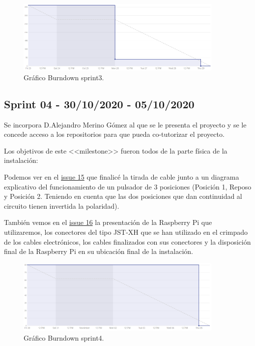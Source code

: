 \begin{figure}[h]
    \centering
    \includegraphics[width=0.9\textwidth]{img/BurnDown/3.PNG}
    \caption{Gráfico Burndown sprint3. } \label{BD3}
\end{figure}

\subsection{Sprint 04 - 30/10/2020 - 05/10/2020}
Se incorpora D.Alejandro Merino Gómez al que se le presenta el proyecto y se le concede acceso a los repositorios para que pueda co-tutorizar el proyecto.

Los objetivos de este <<milestone>> fueron todos de la parte física de la instalación:
\item Podemos ver en el \href{https://github.com/davidelinformatico/TFG/issues/15}{issue 15} que finalicé la tirada de cable junto a un diagrama explicativo del funcionamiento de un pulsador de 3 posiciones (Posición 1, Reposo y Posición 2. Teniendo en cuenta que las dos posiciones que dan continuidad al circuito tienen invertida la polaridad).
\item También vemos en el \href{https://github.com/davidelinformatico/TFG/issues/16}{issue 16} la presentación de la Raspberry Pi que utilizaremos, los conectores del tipo JST-XH que se han utilizado en el crimpado de los cables electrónicos, los cables finalizados con sus conectores y la disposición final de la Raspberry Pi en su ubicación final de la instalación.

\begin{figure}[h]
    \centering
    \includegraphics[width=0.9\textwidth]{img/BurnDown/4.PNG}
    \caption{Gráfico Burndown sprint4. } \label{BD4}
\end{figure}

